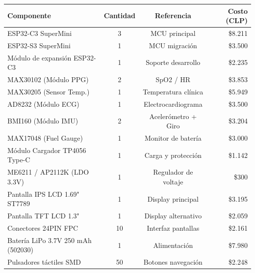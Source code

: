 \documentclass[letterpaper,11pt]{article}
\begin{document}
\begin{table}[H]
    \centering
    \renewcommand{\arraystretch}{1.3}
    \begin{tabular}{|l|c|c|r|}
        \hline
        \rowcolor[HTML]{E5E7E9}
        \textbf{Componente}           & \textbf{Cantidad} & \textbf{Referencia}  & \textbf{Costo (CLP)} \\ \hline
        ESP32-C3 SuperMini            & 3                 & MCU principal        & \$8.211              \\ \hline
        ESP32-S3 SuperMini            & 1                 & MCU migración        & \$3.500              \\ \hline
        Módulo de expansión ESP32-C3  & 1                 & Soporte desarrollo   & \$2.235              \\ \hline
        MAX30102 (Módulo PPG)         & 2                 & SpO2 / HR            & \$3.853              \\ \hline
        MAX30205 (Sensor Temp.)       & 1                 & Temperatura clínica  & \$5.949              \\ \hline
        AD8232 (Módulo ECG)           & 1                 & Electrocardiograma   & \$3.500              \\ \hline
        BMI160 (Módulo IMU)           & 2                 & Acelerómetro + Giro  & \$3.204              \\ \hline
        MAX17048 (Fuel Gauge)         & 1                 & Monitor de batería   & \$3.000              \\ \hline
        Módulo Cargador TP4056 Type-C & 1                 & Carga y protección   & \$1.142              \\ \hline
        ME6211 / AP2112K (LDO 3.3V)   & 1                 & Regulador de voltaje & \$300                \\ \hline
        Pantalla IPS LCD 1.69" ST7789 & 1                 & Display principal    & \$3.195              \\ \hline
        Pantalla TFT LCD 1.3"         & 1                 & Display alternativo  & \$2.059              \\ \hline
        Conectores 24PIN FPC          & 10                & Interfaz pantallas   & \$2.161              \\ \hline
        Batería LiPo 3.7V 250 mAh (502030) & 1            & Alimentación         & \$7.980              \\ \hline
        Pulsadores táctiles SMD       & 50                & Botones navegación   & \$2.248              \\ \hline

\end{tabular}
\end{table}
\end{document}
